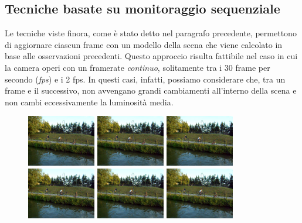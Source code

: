 \subsection{Tecniche basate su monitoraggio sequenziale}
Le tecniche viste finora, come \`e stato detto nel paragrafo precedente, permettono di aggiornare ciascun frame con un modello della scena che viene calcolato in base alle osservazioni precedenti.
Questo approccio risulta fattibile nel caso in cui la camera operi con un framerate \textit{continuo}, solitamente tra i 30 frame per secondo (\textit{fps}) e i 2 fps. 
In questi casi, infatti, possiamo considerare che, tra un frame e il successivo, non avvengano grandi cambiamenti all'interno della scena e non cambi eccessivamente la luminosit\`a media.
\begin{figure}
	\centering
	\includegraphics[width = 3cm]{./pictures/FPSalto/img0001}
	\includegraphics[width = 3cm]{./pictures/FPSalto/img0002}
	\includegraphics[width = 3cm]{./pictures/FPSalto/img0003}
	\includegraphics[width = 3cm]{./pictures/FPSalto/img0004}
	\includegraphics[width = 3cm]{./pictures/FPSalto/img0005}
	\includegraphics[width = 3cm]{./pictures/FPSalto/img0006}

\end{figure}

